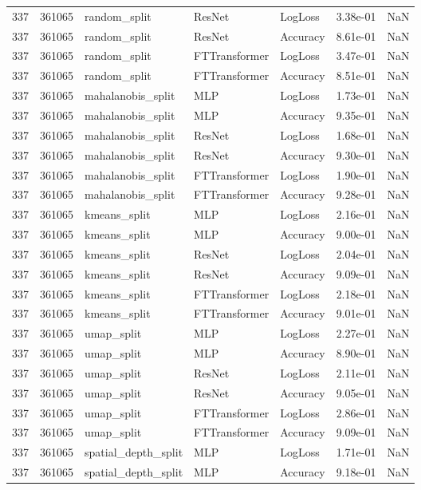 \begin{tabular}{rrlllrr}
337 & 361065 & random\_split & ResNet & LogLoss & 3.38e-01 & NaN \\
337 & 361065 & random\_split & ResNet & Accuracy & 8.61e-01 & NaN \\
337 & 361065 & random\_split & FTTransformer & LogLoss & 3.47e-01 & NaN \\
337 & 361065 & random\_split & FTTransformer & Accuracy & 8.51e-01 & NaN \\
337 & 361065 & mahalanobis\_split & MLP & LogLoss & 1.73e-01 & NaN \\
337 & 361065 & mahalanobis\_split & MLP & Accuracy & 9.35e-01 & NaN \\
337 & 361065 & mahalanobis\_split & ResNet & LogLoss & 1.68e-01 & NaN \\
337 & 361065 & mahalanobis\_split & ResNet & Accuracy & 9.30e-01 & NaN \\
337 & 361065 & mahalanobis\_split & FTTransformer & LogLoss & 1.90e-01 & NaN \\
337 & 361065 & mahalanobis\_split & FTTransformer & Accuracy & 9.28e-01 & NaN \\
337 & 361065 & kmeans\_split & MLP & LogLoss & 2.16e-01 & NaN \\
337 & 361065 & kmeans\_split & MLP & Accuracy & 9.00e-01 & NaN \\
337 & 361065 & kmeans\_split & ResNet & LogLoss & 2.04e-01 & NaN \\
337 & 361065 & kmeans\_split & ResNet & Accuracy & 9.09e-01 & NaN \\
337 & 361065 & kmeans\_split & FTTransformer & LogLoss & 2.18e-01 & NaN \\
337 & 361065 & kmeans\_split & FTTransformer & Accuracy & 9.01e-01 & NaN \\
337 & 361065 & umap\_split & MLP & LogLoss & 2.27e-01 & NaN \\
337 & 361065 & umap\_split & MLP & Accuracy & 8.90e-01 & NaN \\
337 & 361065 & umap\_split & ResNet & LogLoss & 2.11e-01 & NaN \\
337 & 361065 & umap\_split & ResNet & Accuracy & 9.05e-01 & NaN \\
337 & 361065 & umap\_split & FTTransformer & LogLoss & 2.86e-01 & NaN \\
337 & 361065 & umap\_split & FTTransformer & Accuracy & 9.09e-01 & NaN \\
337 & 361065 & spatial\_depth\_split & MLP & LogLoss & 1.71e-01 & NaN \\
337 & 361065 & spatial\_depth\_split & MLP & Accuracy & 9.18e-01 & NaN \\

\end{tabular}
